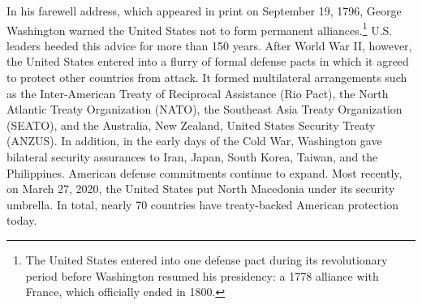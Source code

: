 

 


In his farewell address, which appeared in print on September 19, 1796, George Washington warned the United States not to form permanent alliances.\footnote{The United States entered into one defense pact during its revolutionary period before Washington resumed his presidency: a 1778 alliance with France, which officially ended in 1800.} U.S. leaders heeded this advice for more than 150 years. After World War II, however, the United States entered into a flurry of formal defense pacts in which it agreed to protect other countries from attack. It formed multilateral arrangements such as the Inter-American Treaty of Reciprocal Assistance (Rio Pact), the North Atlantic Treaty Organization (NATO), the Southeast Asia Treaty Organization (SEATO), and the Australia, New Zealand, United States Security Treaty (ANZUS). In addition, in the early days of the Cold War, Washington gave bilateral security assurances to Iran, Japan, South Korea, Taiwan, and the Philippines. American defense commitments continue to expand. Most recently, on March 27, 2020, the United States put North Macedonia under its security umbrella. In total, nearly 70 countries have treaty-backed American protection today.

